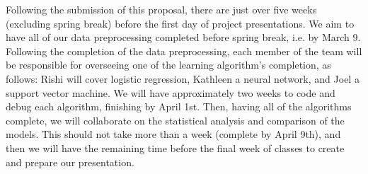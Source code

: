 \documentclass[11pt]{article}
\begin{document}
Following the submission of this proposal, there are just over five weeks (excluding spring break) before the first day of project presentations.  We aim to have all of our data preprocessing completed before spring break, i.e. by March 9.  Following the completion of the data preprocessing, each member of the team will be responsible for overseeing one of the learning algorithm's completion, as follows: Rishi will cover logistic regression, Kathleen a neural network, and Joel a support vector machine.  We will have approximately two weeks to code and debug each algorithm, finishing by April 1st.  Then, having all of the algorithms complete, we will collaborate on the statistical analysis and comparison of the models.  This should not take more than a week (complete by April 9th), and then we will have the remaining time before the final week of classes to create and prepare our presentation.
\end{document}
